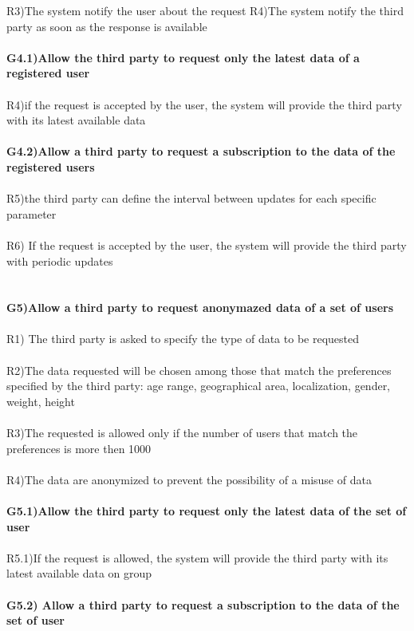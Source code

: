 R3)The system notify the user about the request 
R4)The system notify the third party as soon as the response is available \\ \\
\textbf{G4.1)Allow the third party to request only the latest data of a registered user} \\ \\
R4)if the request is accepted by the user, the system will provide the third party with its latest available data \\ \\ 
\textbf{G4.2)Allow a third party to request a subscription to the data of the registered users} \\ \\
R5)the third party can define the interval between updates for each specific parameter \\ \\
R6) If the request is accepted by the user, the system will provide the third party with periodic updates \\ \\ \\
\textbf{G5)Allow a third party to request anonymazed data of a set of users} \\ \\
R1) The third party is asked to specify the type of data to be requested \\ \\
 R2)The data requested will be chosen among those that match the preferences specified by the third party: age range, geographical area, localization, gender, weight, height \\ \\
R3)The requested is allowed only if the number of users that match the preferences is more then 1000 \\ \\
R4)The data are anonymized to prevent the possibility of a misuse of data \\ \\ 
\textbf{G5.1)Allow the third party to request only the latest data of the set of user} \\ \\
R5.1)If the request is allowed, the system will provide the third party with its latest available data on group \\ \\
\textbf{G5.2) Allow a third party to request a subscription to the data of the set of user} \\ \\
